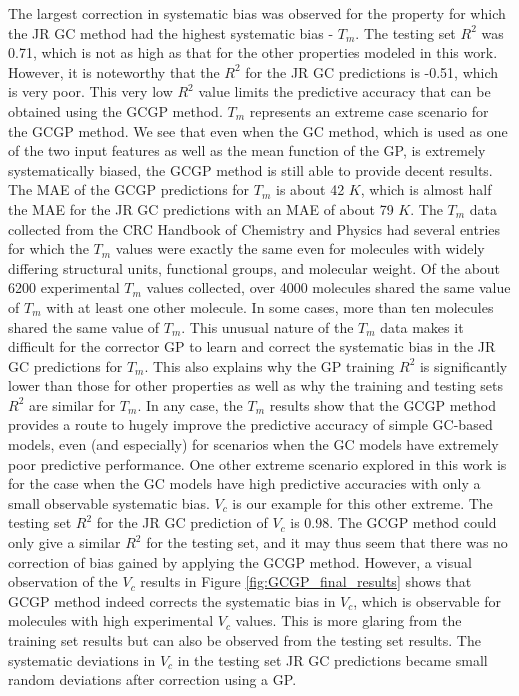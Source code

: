 \documentclass[journal=jacsat,manuscript=article]{achemso}
\begin{document}
 
The largest correction in systematic bias was observed for the property for which the JR GC method had the highest systematic bias - $T_m$. The testing set $R^2$ was 0.71, which is not as high as that for the other properties modeled in this work. However, it is noteworthy that the $R^2$ for the JR GC predictions is -0.51, which is very poor. This very low $R^2$ value limits the predictive accuracy that can be obtained using the GCGP method. $T_m$ represents an extreme case scenario for the GCGP method. We see that even when the GC method, which is used as one of the two input features as well as the mean function of the GP, is extremely systematically biased, the GCGP method is still able to provide decent results. The MAE of the GCGP predictions for $T_m$ is about 42 $K$, which is almost half the MAE for the JR GC predictions with an MAE of about 79 $K$. The $T_m$ data collected from the CRC Handbook of Chemistry and Physics had several entries for which the $T_m$ values were exactly the same even for molecules with widely differing structural units, functional groups, and molecular weight. Of the about 6200 experimental $T_m$  values collected, over 4000 molecules shared the same value of $T_m$ with at least one other molecule. In some cases, more than ten molecules shared the same value of $T_m$. This unusual nature of the $T_m$ data makes it difficult for the corrector GP to learn and correct the systematic bias in the JR GC predictions for $T_m$. This also explains why the GP training $R^2$ is significantly lower than those for other properties as well as why the training and testing sets $R^2$ are similar for $T_m$. In any case, the $T_m$ results show that the GCGP method provides a route to hugely improve the predictive accuracy of simple GC-based models, even (and especially) for scenarios when the GC models have extremely poor predictive performance. One other extreme scenario explored in this work is for the case when the GC models have high predictive accuracies with only a small observable systematic bias. $V_c$ is our example for this other extreme. The testing set $R^2$ for the JR GC prediction of $V_c$ is 0.98. The GCGP method could only give a similar $R^2$ for the testing set, and it may thus seem that there was no correction of bias gained by applying the GCGP method. However, a visual observation of the $V_c$ results in Figure \ref{fig:GCGP_final_results} shows that GCGP method indeed corrects the systematic bias in $V_c$, which is observable for molecules with high experimental $V_c$ values. This is more glaring from the training set results but can also be observed from the testing set results. The systematic deviations in $V_c$ in the testing set JR GC predictions became small random deviations after correction using a GP.
\end{document}
